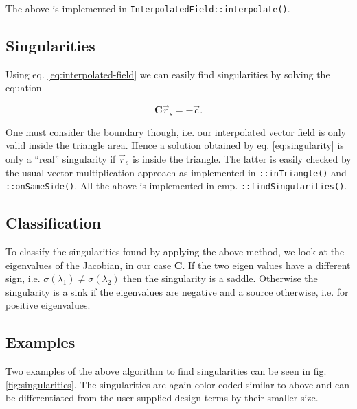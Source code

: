 \documentclass[a4paper,10pt,notitlepage]{scrreprt}
\newcommand{\mat}[1]{\mathbf{#1}}
\begin{document}
The above is implemented in \texttt{InterpolatedField::interpolate()}.

\subsection{Singularities}

Using eq. \ref{eq:interpolated-field} we can easily find singularities by
solving the equation

\begin{equation}
 \mat{C} \vec{r}_s = - \vec{c}.
 \label{eq:singularity}
\end{equation}

One must consider the boundary though, i.e. our interpolated vector field is
only valid inside the triangle area. Hence a solution obtained by
eq. \ref{eq:singularity} is only a ``real'' singularity if $\vec{r}_s$ is
inside the triangle. The latter is easily checked by the usual vector
multiplication approach as implemented in \texttt{::inTriangle()} and
\texttt{::onSameSide()}. All the above is implemented in cmp.
\texttt{::findSingularities()}.

\subsection{Classification}

To classify the singularities found by applying the above method, we look at
the eigenvalues of the Jacobian, in our case $\mat{C}$. If the two eigen values
have a different sign, i.e. $\sigma(\lambda_1) \neq \sigma(\lambda_2)$ then the
singularity is a saddle. Otherwise the singularity is a sink if the eigenvalues
are negative and a source otherwise, i.e. for positive eigenvalues.

\subsection{Examples}

Two examples of the above algorithm to find singularities can be seen in fig.
\ref{fig:singularities}. The singularities are again color coded similar to
above and can be differentiated from the user-supplied design terms by their
smaller size.
\end{document}
